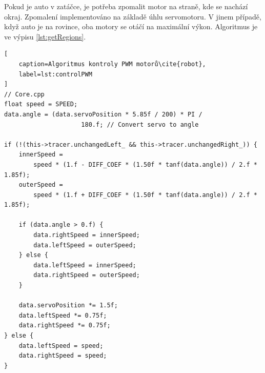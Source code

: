 Pokud je auto v zatáčce, je potřeba zpomalit motor na straně, kde se nachází okraj.
Zpomalení implementováno na základě úhlu servomotoru. V jinem případě, když auto je na rovince, oba motory se otáčí na maximální výkon.
Algoritmus je ve výpisu \ref{lst:getRegions}\cite{robot}.
\begin{lstlisting}[
	caption=Algoritmus kontroly PWM motorů\cite{robot},
	label=lst:controlPWM
]
// Core.cpp
float speed = SPEED;
data.angle = (data.servoPosition * 5.85f / 200) * PI /
	                 180.f; // Convert servo to angle

if (!(this->tracer.unchangedLeft_ && this->tracer.unchangedRight_)) {
    innerSpeed =
        speed * (1.f - DIFF_COEF * (1.50f * tanf(data.angle)) / 2.f * 1.85f);
    outerSpeed =
        speed * (1.f + DIFF_COEF * (1.50f * tanf(data.angle)) / 2.f * 1.85f);

    if (data.angle > 0.f) {
        data.rightSpeed = innerSpeed;
        data.leftSpeed = outerSpeed;
    } else {
        data.leftSpeed = innerSpeed;
        data.rightSpeed = outerSpeed;
    }

    data.servoPosition *= 1.5f;
    data.leftSpeed *= 0.75f;
    data.rightSpeed *= 0.75f;
} else {
    data.leftSpeed = speed;
    data.rightSpeed = speed;
}
\end{lstlisting}

\endinput
